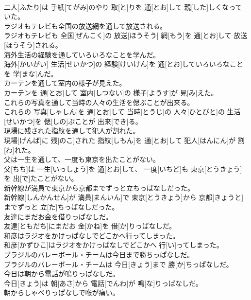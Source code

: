\documentclass[8pt]{extreport}
\begin{document}
\begin{CJK}{UTF8}{min}
\\	二人[ふたり]は 手紙[てがみ]のやり 取[と]りを 通[とお]して 親[した]しくなっていた。
\\	ラジオもテレビも全国の放送網を通して放送される。	
\\	ラジオもテレビも 全国[ぜんこく]の 放送[ほうそう] 網[もう]を 通[とお]して 放送[ほうそう]される。
\\	海外生活の経験を通していろいろなことを学んだ。	
\\	海外[かいがい] 生活[せいかつ]の 経験[けいけん]を 通[とお]していろいろなことを 学[まな]んだ。
\\	カーテンを通して室内の様子が見えた。	
\\	カーテンを 通[とお]して 室内[しつない]の 様子[ようす]が 見[み]えた。
\\	これらの写真を通して当時の人々の生活を偲ぶことが出来る。	
\\	これらの 写真[しゃしん]を 通[とお]して 当時[とうじ]の 人々[ひとびと]の 生活[せいかつ]を 偲[しの]ぶことが 出来[でき]る。
\\	現場に残された指紋を通して犯人が割れた。	
\\	現場[げんば]に 残[のこ]された 指紋[しもん]を 通[とお]して 犯人[はんにん]が 割[わ]れた。
\\	父は一生を通して、一度も東京を出たことがない。	
\\	父[ちち]は 一生[いっしょう]を 通[とお]して、 一度[いちど]も 東京[とうきょう]を 出[で]たことがない。
\\	新幹線が満員で東京から京都までずっと立ちっぱなしだった。	
\\	新幹線[しんかんせん]が 満員[まんいん]で 東京[とうきょう]から 京都[きょうと]までずっと 立[た]ちっぱなしだった。
\\	友達にまだお金を借りっぱなしだ。	
\\	友達[ともだち]にまだお 金[かね]を 借[か]りっぱなしだ。
\\	和彦はラジオをかけっぱなしでどこかへ行ってしまった。	
\\	和彦[かずひこ]はラジオをかけっぱなしでどこかへ 行[い]ってしまった。
\\	ブラジルのバレーボール・チームは今日まで勝ちっぱなしだ。	
\\	ブラジルのバレーボール・チームは 今日[きょう]まで 勝[か]ちっぱなしだ。
\\	今日は朝から電話が鳴りっぱなしだ。	
\\	今日[きょう]は 朝[あさ]から 電話[でんわ]が 鳴[な]りっぱなしだ。
\\	朝からしゃべりっぱなしで喉が痛い。	

\end{CJK}
\end{document}

